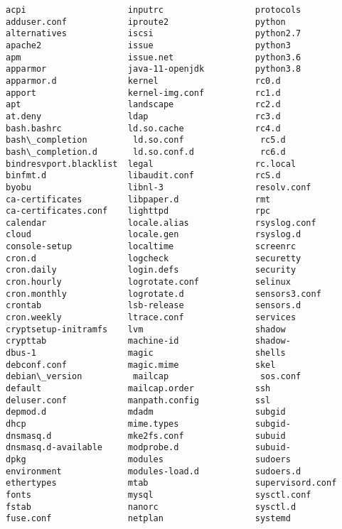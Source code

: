 \documentclass[11pt]{article}
\begin{document}
    \begin{Verbatim}[commandchars=\\\{\}]
acpi                    inputrc                  protocols
adduser.conf            iproute2                 python
alternatives            iscsi                    python2.7
apache2                 issue                    python3
apm                     issue.net                python3.6
apparmor                java-11-openjdk          python3.8
apparmor.d              kernel                   rc0.d
apport                  kernel-img.conf          rc1.d
apt                     landscape                rc2.d
at.deny                 ldap                     rc3.d
bash.bashrc             ld.so.cache              rc4.d
bash\_completion         ld.so.conf               rc5.d
bash\_completion.d       ld.so.conf.d             rc6.d
bindresvport.blacklist  legal                    rc.local
binfmt.d                libaudit.conf            rcS.d
byobu                   libnl-3                  resolv.conf
ca-certificates         libpaper.d               rmt
ca-certificates.conf    lighttpd                 rpc
calendar                locale.alias             rsyslog.conf
cloud                   locale.gen               rsyslog.d
console-setup           localtime                screenrc
cron.d                  logcheck                 securetty
cron.daily              login.defs               security
cron.hourly             logrotate.conf           selinux
cron.monthly            logrotate.d              sensors3.conf
crontab                 lsb-release              sensors.d
cron.weekly             ltrace.conf              services
cryptsetup-initramfs    lvm                      shadow
crypttab                machine-id               shadow-
dbus-1                  magic                    shells
debconf.conf            magic.mime               skel
debian\_version          mailcap                  sos.conf
default                 mailcap.order            ssh
deluser.conf            manpath.config           ssl
depmod.d                mdadm                    subgid
dhcp                    mime.types               subgid-
dnsmasq.d               mke2fs.conf              subuid
dnsmasq.d-available     modprobe.d               subuid-
dpkg                    modules                  sudoers
environment             modules-load.d           sudoers.d
ethertypes              mtab                     supervisord.conf
fonts                   mysql                    sysctl.conf
fstab                   nanorc                   sysctl.d
fuse.conf               netplan                  systemd

\end{Verbatim}
\end{document}
